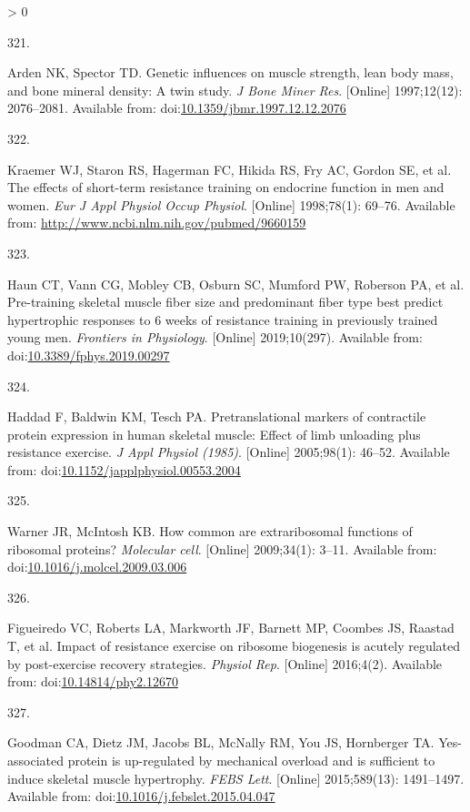 \documentclass[twoside,10pt]{gihclass} %
\newlength{\cslhangindent}
\newlength{\csllabelwidth}
\newenvironment{CSLReferences}[3] %
 {%
  \setlength{\parindent}{0pt}
  \ifodd #1 \everypar{\setlength{\hangindent}{\cslhangindent}}\ignorespaces\fi
  \ifnum #2 > 0
  \setlength{\parskip}{#2\baselineskip}
  \fi
 }%
 {}
\newcommand{\CSLLeftMargin}[1]{\parbox[t]{\maxof{\widthof{#1}}{\csllabelwidth}}{#1}}
\newcommand{\CSLRightInline}[1]{\parbox[t]{\linewidth}{#1}}
\begin{document}
\begin{CSLReferences}{0}{0}
\leavevmode\hypertarget{ref-RN2884}{}%
\CSLLeftMargin{321. }
\CSLRightInline{Arden NK, Spector TD. Genetic influences on muscle strength, lean body mass, and bone mineral density: A twin study. \emph{J Bone Miner Res}. {[}Online{]} 1997;12(12): 2076--2081. Available from: doi:\href{https://doi.org/10.1359/jbmr.1997.12.12.2076}{10.1359/jbmr.1997.12.12.2076}}

\leavevmode\hypertarget{ref-RN166}{}%
\CSLLeftMargin{322. }
\CSLRightInline{Kraemer WJ, Staron RS, Hagerman FC, Hikida RS, Fry AC, Gordon SE, et al. The effects of short-term resistance training on endocrine function in men and women. \emph{Eur J Appl Physiol Occup Physiol}. {[}Online{]} 1998;78(1): 69--76. Available from: \url{http://www.ncbi.nlm.nih.gov/pubmed/9660159}}

\leavevmode\hypertarget{ref-RN2225}{}%
\CSLLeftMargin{323. }
\CSLRightInline{Haun CT, Vann CG, Mobley CB, Osburn SC, Mumford PW, Roberson PA, et al. Pre-training skeletal muscle fiber size and predominant fiber type best predict hypertrophic responses to 6 weeks of resistance training in previously trained young men. \emph{Frontiers in Physiology}. {[}Online{]} 2019;10(297). Available from: doi:\href{https://doi.org/10.3389/fphys.2019.00297}{10.3389/fphys.2019.00297}}

\leavevmode\hypertarget{ref-RN2180}{}%
\CSLLeftMargin{324. }
\CSLRightInline{Haddad F, Baldwin KM, Tesch PA. Pretranslational markers of contractile protein expression in human skeletal muscle: Effect of limb unloading plus resistance exercise. \emph{J Appl Physiol (1985)}. {[}Online{]} 2005;98(1): 46--52. Available from: doi:\href{https://doi.org/10.1152/japplphysiol.00553.2004}{10.1152/japplphysiol.00553.2004}}

\leavevmode\hypertarget{ref-RN2588}{}%
\CSLLeftMargin{325. }
\CSLRightInline{Warner JR, McIntosh KB. How common are extraribosomal functions of ribosomal proteins? \emph{Molecular cell}. {[}Online{]} 2009;34(1): 3--11. Available from: doi:\href{https://doi.org/10.1016/j.molcel.2009.03.006}{10.1016/j.molcel.2009.03.006}}

\leavevmode\hypertarget{ref-RN1746}{}%
\CSLLeftMargin{326. }
\CSLRightInline{Figueiredo VC, Roberts LA, Markworth JF, Barnett MP, Coombes JS, Raastad T, et al. Impact of resistance exercise on ribosome biogenesis is acutely regulated by post-exercise recovery strategies. \emph{Physiol Rep}. {[}Online{]} 2016;4(2). Available from: doi:\href{https://doi.org/10.14814/phy2.12670}{10.14814/phy2.12670}}

\leavevmode\hypertarget{ref-RN1931}{}%
\CSLLeftMargin{327. }
\CSLRightInline{Goodman CA, Dietz JM, Jacobs BL, McNally RM, You JS, Hornberger TA. Yes-associated protein is up-regulated by mechanical overload and is sufficient to induce skeletal muscle hypertrophy. \emph{FEBS Lett}. {[}Online{]} 2015;589(13): 1491--1497. Available from: doi:\href{https://doi.org/10.1016/j.febslet.2015.04.047}{10.1016/j.febslet.2015.04.047}}


\end{CSLReferences}
\end{document}
